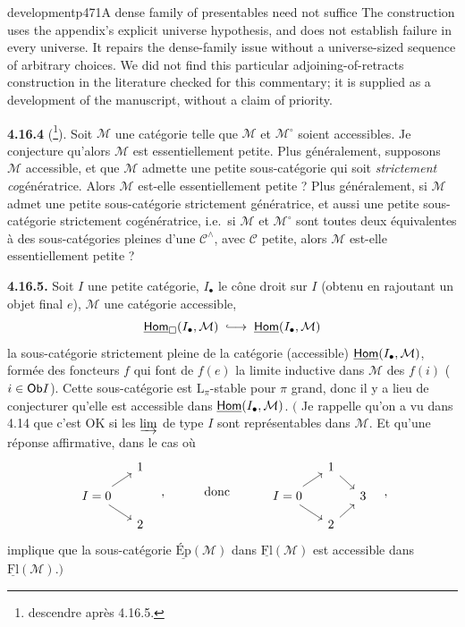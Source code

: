 \begin{dcomment}{development}{p471}{A dense family of presentables need not suffice}
The construction uses the appendix's explicit universe hypothesis, and does not establish failure in every universe. It repairs the dense-family issue without a universe-sized sequence of arbitrary choices. We did not find this particular adjoining-of-retracts construction in the literature checked for this commentary; it is supplied as a development of the manuscript, without a claim of priority.
\end{dcomment}


\textbf{4.16.4} (\footnote[194]{descendre après 4.16.5.}). Soit $\mathcal{M}$ une catégorie telle que $\mathcal{M}$ et $\mathcal{M}^\circ$ soient accessibles. Je conjecture qu'alors $\mathcal{M}$ est essentiellement petite. Plus généralement, supposons $\mathcal{M}$ accessible, et que $\mathcal{M}$ admette une petite sous-catégorie qui soit \textit{strictement co}génératrice. Alors $\mathcal{M}$ est-elle essentiellement petite ? Plus généralement, si $\mathcal{M}$ admet une petite sous-catégorie strictement génératrice, et aussi une petite sous-catégorie strictement cogénératrice, i.e.\ si $\mathcal{M}$ et $\mathcal{M}^\circ$ sont toutes deux équivalentes à des sous-catégories pleines d'une $\mathcal{C}^\wedge$, avec $\mathcal{C}$ petite, alors $\mathcal{M}$ est-elle essentiellement petite ?

\textbf{4.16.5.} Soit $I$ une petite catégorie, $I_\bullet$ le cône droit sur $I$ (obtenu en rajoutant un objet final $e$), $\mathcal{M}$ une catégorie accessible,
\[
\underline{\Hom}_{\square}(I_\bullet,\mathcal{M}) \;\into\; \underline{\Hom}(I_\bullet,\mathcal{M})
\]
la sous-catégorie strictement pleine de la catégorie (accessible) $\underline{\mathsf{Hom}}(I_\bullet,\mathcal{M})$, formée des foncteurs $f$ qui font de $f(e)$ la limite inductive dans $\mathcal{M}$ des $f(i)$ ($i \in \mathsf{Ob} I$). Cette sous-catégorie est $\mathrm{L}_\pi$-stable pour $\pi$ grand, donc il y a lieu
de conjecturer qu'elle est accessible dans $\underline{\mathsf{Hom}}(I_\bullet,\mathcal{M})$. $\Big($ Je rappelle qu'on a vu dans 4.14 que c'est OK si les $\varinjlim$ de type $I$ sont représentables dans $\mathcal{M}$. Et qu'une réponse affirmative, dans le cas où
\[
\begin{tikzcd}[row sep=small, column sep=small]
 & 1 \\
I = 0 \arrow[ur] \arrow[dr] & \\
 & 2
\end{tikzcd}
\quad ,\qquad\quad \text{donc} \qquad\quad
\begin{tikzcd}[row sep=small, column sep=small]
 & 1 \arrow[dr] & \\
I = 0 \arrow[ur] \arrow[dr] & & 3 \\
 & 2 \arrow[ur] &
\end{tikzcd}
\quad ,
\]
implique que la sous-catégorie $\underline{\text{Ép}}(\mathcal{M})$ dans $\underline{\mathrm{Fl}}(\mathcal{M})$ est accessible dans $\underline{\mathrm{Fl}}(\mathcal{M})$.$\Big)$

